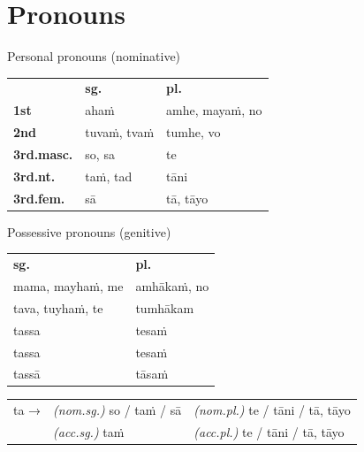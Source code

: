 \documentclass[a4paper]{memoir}
\begin{document}
\section{Pronouns}
\label{sec:org6fde3ec}

{\centering\par
\begin{multicols}{2}

Personal pronouns (nominative)

\begin{center}
\begin{tabular}{lll}
 & \textbf{sg.} & \textbf{pl.}\\[0pt]
\textbf{1st} & ahaṁ & amhe, mayaṁ, no\\[0pt]
\textbf{2nd} & tuvaṁ, tvaṁ & tumhe, vo\\[0pt]
\textbf{3rd.masc.} & so, sa & te\\[0pt]
\textbf{3rd.nt.} & taṁ, tad & tāni\\[0pt]
\textbf{3rd.fem.} & sā & tā, tāyo\\[0pt]
\end{tabular}
\end{center}

\columnbreak

Possessive pronouns (genitive)

\begin{center}
\begin{tabular}{ll}
\textbf{sg.} & \textbf{pl.}\\[0pt]
mama, mayhaṁ, me & amhākaṁ, no\\[0pt]
tava, tuyhaṁ, te & tumhākam\\[0pt]
tassa & tesaṁ\\[0pt]
tassa & tesaṁ\\[0pt]
tassā & tāsaṁ\\[0pt]
\end{tabular}
\end{center}

\end{multicols}
\par}

\begin{center}
\begin{tabular}{lll}
ta → & \emph{(nom.sg.)} so / taṁ / sā & \emph{(nom.pl.)} te / tāni / tā, tāyo\\[0pt]
 & \emph{(acc.sg.)} taṁ & \emph{(acc.pl.)}  te / tāni / tā, tāyo\\[0pt]
\end{tabular}
\end{center}
\end{document}
